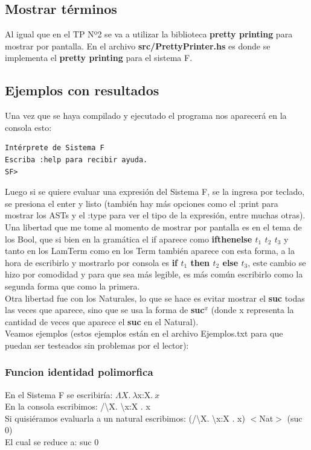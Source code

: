 \documentclass[12pt, titlepage, a4paper]{article}
\begin{document}
\subsection{Mostrar términos}
Al igual que en el TP Nº2 \cite{tp2:lambdaCalculoSimpleTipado} se va a utilizar la biblioteca \textbf{pretty printing} para mostrar por 
pantalla. En el archivo
\textbf{src/PrettyPrinter.hs} es donde se implementa el \textbf{pretty printing} para el sistema F.

\subsection{Ejemplos con resultados}
Una vez que se haya compilado y ejecutado el programa nos aparecerá en la consola esto:

\begin{verbatim}
Intérprete de Sistema F
Escriba :help para recibir ayuda.
SF>
\end{verbatim}

Luego si se quiere evaluar una expresión del Sistema F, se la ingresa por teclado, se presiona el enter y listo 
(también hay más opciones como el :print para mostrar los ASTs y el :type para ver el tipo de la expresión, entre muchas otras). \\

Una libertad que me tome al momento de mostrar por pantalla es 
en el tema de los Bool, que si bien en la gramática el if aparece como \textbf{ifthenelse $t_1$ $t_2$ $t_3$} y 
tanto en los LamTerm como en los Term también aparece con esta forma, a la hora de escribirlo y mostrarlo por consola es 
\textbf{if $t_1$ then $t_2$ else $t_3$}, este cambio se hizo por comodidad y para que sea más legible, es más común escribirlo como la segunda forma que como 
la primera.\\

Otra libertad fue con los Naturales, lo que se hace es evitar mostrar el \textbf{suc} todas las veces que aparece, sino que se usa 
la forma de \textbf{suc$^x$} (donde x representa la cantidad de veces que aparece el \textbf{suc} en el Natural). \\

Veamos ejemplos (estos ejemplos están en el archivo Ejemplos.txt para que puedan ser testeados sin problemas por el lector):

\subsubsection{Funcion identidad polimorfica}
\noindent En el Sistema F se escribiría: $\Lambda X.\ \lambda $x:X$. \ x$ \\
En la consola escribimos: /\textbackslash X. \textbackslash x:X . x \\
Si quisiéramos evaluarla a un natural escribimos: (/\textbackslash X. \textbackslash x:X . x)  $<$Nat$>$ (suc 0) \\
El cual se reduce a: suc 0
\end{document}
